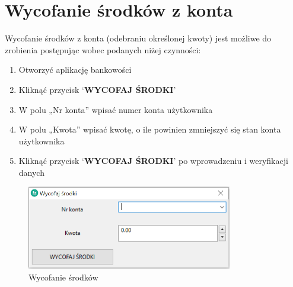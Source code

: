 \documentclass[a4paper,12pt]{article}
\begin{document}
	\section{Wycofanie środków z konta}
	Wycofanie środków z konta (odebraniu określonej kwoty) jest możliwe do zrobienia postępując wobec podanych niżej czynności:
	\begin{enumerate}
		\item Otworzyć aplikację bankowości
		\item Kliknąć przycisk ‘\textbf{WYCOFAJ ŚRODKI}’
		\item W polu „Nr konta” wpisać numer konta użytkownika
		\item W polu „Kwota” wpisać kwotę, o ile powinien zmniejszyć się stan konta użytkownika
		\item Kliknąć przycisk ‘\textbf{WYCOFAJ ŚRODKI}’ po wprowadzeniu i weryfikacji danych 
	\end{enumerate}
\begin{figure}[h]
	\centering
	\includegraphics[width=0.8\textwidth]{wycofaj.png}
	\caption{Wycofanie środków}
	\label{wycofaj}
\end{figure}
\end{document}
